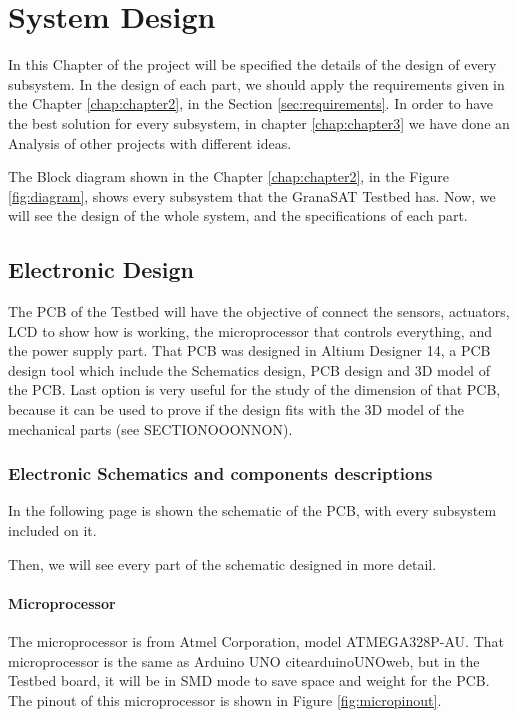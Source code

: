 \chapter{System Design} \label{chap:chapter4}

In this Chapter of the project will be specified the details of the design of every subsystem. In the design of each part, we should apply the requirements given in the Chapter \ref{chap:chapter2}, in the Section \ref{sec:requirements}.
In order to have the best solution for every subsystem, in chapter \ref{chap:chapter3} we have done an Analysis of other projects with different ideas. 

The Block diagram shown in the Chapter \ref{chap:chapter2}, in the Figure \ref{fig:diagram}, shows every subsystem that the \gls{GranaSAT} Testbed has. Now, we will see the design of the whole system, and the specifications of each part. 

\section{Electronic Design} \label{sec:electronicdesign}

The \acrshort{PCB} of the Testbed will have the objective of connect the sensors, actuators, LCD to show how is working, the microprocessor that controls everything, and the power supply part. That \acrshort{PCB} was designed in Altium Designer 14, a \acrshort{PCB} design tool which include the Schematics design, \acrshort{PCB} design and 3D model of the \acrshort{PCB}. Last option is very useful for the study of the dimension of that \acrshort{PCB}, because it can be used to prove if the design fits with the 3D model of the mechanical parts (see SECTIONOOONNON).

\subsection{Electronic Schematics and components descriptions} \label{ssec:SCHdesign}

In the following page is shown the schematic of the \acrshort{PCB}, with every subsystem included on it.



Then, we will see every part of the schematic designed in more detail. 

\subsubsection{Microprocessor} \label{sssec:micro}
The microprocessor is from Atmel Corporation, model ATMEGA328P-AU. That microprocessor is the same as Arduino UNO cite{arduinoUNOweb}, but in the Testbed board, it will be in \acrshort{SMD} mode to save space and weight for the \acrshort{PCB}. The pinout of this microprocessor is shown in Figure \ref{fig:micropinout}.


